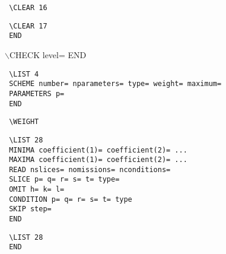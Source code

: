 \documentclass[10pt,a4paper]{report}
\begin{document}
\bigskip{}



\small\begin{verbatim}
 \CLEAR 16
\end{verbatim}\normalsize




\bigskip{}



\small\begin{verbatim}
 \CLEAR 17
 END
\end{verbatim}\normalsize




\bigskip{}



 $\backslash$CHECK level=
 END





\bigskip{}



\small\begin{verbatim}
 \LIST 4
 SCHEME number= nparameters= type= weight= maximum=
 PARAMETERS p=
 END
\end{verbatim}\normalsize




\bigskip{}



\small\begin{verbatim}
 \WEIGHT
\end{verbatim}\normalsize




\bigskip{}



\small\begin{verbatim}
 \LIST 28
 MINIMA coefficient(1)= coefficient(2)= ...
 MAXIMA coefficient(1)= coefficient(2)= ...
 READ nslices= nomissions= nconditions=
 SLICE p= q= r= s= t= type=
 OMIT h= k= l=
 CONDITION p= q= r= s= t= type
 SKIP step=
 END
\end{verbatim}\normalsize




\bigskip{}


\small\begin{verbatim}
 \LIST 28
 END
\end{verbatim}\normalsize
\end{document}
